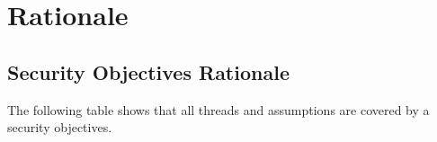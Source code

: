 \documentclass[12pt,english]{scrbook}
\begin{document}


\chapter{Rationale}





\section{Security Objectives Rationale}

The following table shows that all threads and assumptions are covered
by a security objectives. 
\end{document}
